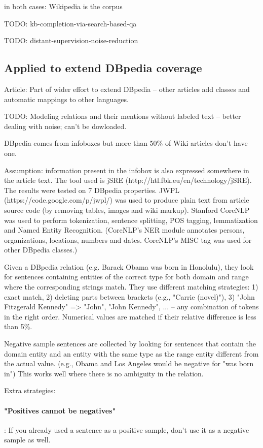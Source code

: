 in both cases: Wikipedia is the corpus

TODO: kb-completion-via-search-based-qa

TODO: distant-supervision-noise-reduction

\subsection{Applied to extend DBpedia coverage}
Article:
\cite{extending-dbpedia-coverage-using-distant-supervision-over-wikipedia}
Part of wider effort to extend DBpedia -- other articles add classes and
automatic mappings to other languages.

TODO: Modeling relations and their mentions without labeled text -- better
dealing with noise; can't be dowloaded.

DBpedia comes from infoboxes but more than 50\% of Wiki articles don't have one.

Assumption: information present in the infobox is also expressed somewhere in
the article text. The tool used is jSRE (http://htl.fbk.eu/en/technology/jSRE).
The results were tested on 7 DBpedia properties.
JWPL (https://code.google.com/p/jwpl/) was used to produce plain text from
article source code (by removing tables, images and wiki markup). Stanford
CoreNLP was used to perform tokenization, sentence splitting, POS tagging,
lemmatization and Named Entity Recognition. (CoreNLP's NER module annotates
persons, organizations, locations, numbers and dates. CoreNLP's MISC tag was
used for other DBpedia classes.)

Given a DBpedia relation (e.g. Barack Obama was born in Honolulu), they look for
sentences containing entities of the correct type for both domain and range
where the corresponding strings match. They use different matching strategies:
1) exact match, 2) deleting parts between brackets (e.g., "Carrie (novel)"), 3)
"John Fitzgerald Kennedy" => "John", "John Kennedy", ... -- any combination
of tokens in the right order. Numerical values are matched if their relative
difference is less than 5\%.

Negative sample sentences are collected by looking for sentences that contain
the domain entity and an entity with the same type as the range entity different
from the actual value. (e.g., Obama and Los Angeles would be negative for "was
born in") This works well where there is no ambiguity in the relation.

Extra strategies:

\paragraph{"Positives cannot be negatives"}: If you already used a sentence as a
positive sample, don't use it as a negative sample as well.

